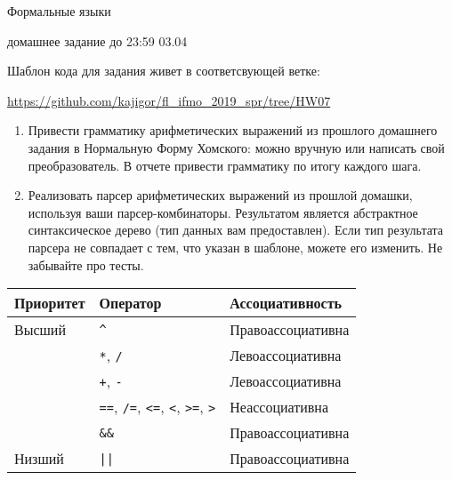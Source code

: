 \documentclass[12pt]{article}
\begin{document}
\begin{center}
\LARGE {Формальные языки}

\Large {домашнее задание до 23:59 03.04}
\end{center} 

\bigskip

Шаблон кода для задания живет в соответсвующей ветке: 

\url{https://github.com/kajigor/fl\_ifmo\_2019\_spr/tree/HW07}

\begin{enumerate}
  \item
  Привести грамматику арифметических выражений из прошлого домашнего задания в Нормальную Форму Хомского: можно вручную или написать свой преобразователь. В отчете привести грамматику по итогу каждого шага.  
  \item 
  Реализовать парсер арифметических выражений из прошлой домашки, используя ваши парсер-комбинаторы. Результатом является абстрактное синтаксическое дерево (тип данных вам предоставлен). Если тип результата парсера не совпадает с тем, что указан в шаблоне, можете его изменить. Не забывайте про тесты.
\end{enumerate}

\begin{table}[h]
\centering
\begin{tabular}{l|l|l}
Приоритет & Оператор & Ассоциативность \\ \hline
Высший & \verb!^! & Правоассоциативна \\
       & \verb!*!, \verb!/! & Левоассоциативна  \\
       & \verb!+!, \verb!-! & Левоассоциативна  \\
       & \verb!==!, \verb!/=!, \verb!<=!, \verb!<!, \verb!>=!, \verb!>! & Неассоциативна \\
       & \verb!&&! & Правоассоциативна \\
Низший & \verb!||! & Правоассоциативна 
\end{tabular}
\end{table}
\end{document}
